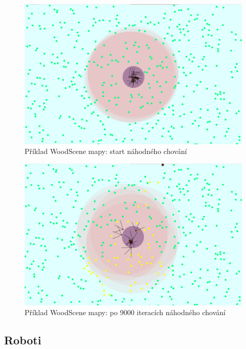 \begin{figure}[p]\centering
	\includegraphics[width=\columnwidth]{../img/WoodMap/pictures/StartRandom.png}
	\caption{Příklad WoodScene mapy: start náhodného chování}
	\label{obr04:WoodSceneRandomStart}
\end{figure}
\par

\begin{figure}[p]\centering
	\includegraphics[width=\columnwidth]{../img/WoodMap/pictures/EndRandom.png}
	\caption{Příklad WoodScene mapy: po 9000 iteracích náhodného chování}
	\label{obr04:WoodSceneRandomEnd}
\end{figure}
\clearpage
\subsection{Roboti}
